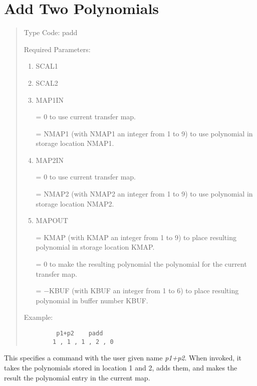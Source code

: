 \newpage
\section{Add Two Polynomials} 
\begin{quotation}
\noindent     Type Code:  padd
\vspace{5mm}

\noindent Required Parameters:
\begin{enumerate}
      \item  SCAL1

	  \item  SCAL2

      \item  MAP1IN

             = 0 to use current transfer map.

             = NMAP1 (with NMAP1 an integer from 1 to 9) to use polynomial in
               \hspace*{1em}storage location NMAP1.

      \item  MAP2IN

             = 0 to use current transfer map.

             = NMAP2 (with NMAP2 an integer from 1 to 9) to use polynomial in
               \hspace*{1em} storage location NMAP2.

      \item  MAPOUT

             = KMAP (with KMAP an integer from 1 to 9) to place resulting
               polynomial \hspace*{1em}in storage location KMAP.

             = 0 to make the resulting polynomial the polynomial for the current transfer \hspace*{1em}map.

             = $-$KBUF (with KBUF an integer from 1 to 6) to place resulting
               polynomial \hspace*{1em}in buffer number KBUF.
\end{enumerate}

\vspace{5mm}
\noindent Example:
\begin{verbatim}
         p1+p2    padd
        1 , 1 , 1 , 2 , 0
\end{verbatim}
\end{quotation}
This specifies a command with the user given name {\em p1+p2}.  When invoked, it takes the polynomials stored in location 1 and 2, adds them, and makes the result the polynomial entry in the current map.

